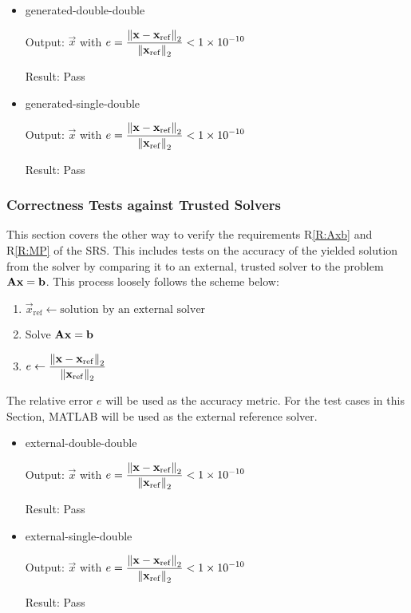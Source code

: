 \documentclass[12pt, titlepage]{article}
\newcommand{\rref}[1]{R\ref{#1}}
\newcommand{\tref}[1]{T\ref{#1}}
\begin{document}
\begin{itemize}

\item[\tref{T:gdd}:]{generated-double-double}

  Output: \(\vec{x}\) with \(e = \displaystyle \frac{\left\lVert\mathbf{x} -
      \mathbf{x}_\mathrm{ref}\right\rVert_2}{\left\lVert\mathbf{x}_\mathrm{ref}\right\rVert_2} < \num{1e-10}\)

  Result: Pass

\item[\tref{T:gsd}:]{generated-single-double}

  Output: \(\vec{x}\) with \(e = \displaystyle \frac{\left\lVert\mathbf{x} -
      \mathbf{x}_\mathrm{ref}\right\rVert_2}{\left\lVert\mathbf{x}_\mathrm{ref}\right\rVert_2} < \num{1e-10}\)

  Result: Pass

\end{itemize}

\subsubsection{Correctness Tests against Trusted Solvers}
\label{sec:corr-tests-against}

This section covers the other way to verify the requirements \rref{R:Axb} and
\rref{R:MP} of the SRS. This includes tests on the accuracy of the yielded
solution from the solver by comparing it to an external, trusted solver to the
problem \(\mathbf{A}\mathbf{x} = \mathbf{b}\). This process loosely follows the scheme
below:

\begin{enumerate}
\item \(\vec{x}_\mathrm{ref} \gets \text{solution by an external solver}\)
\item Solve \(\mathbf{A}\mathbf{x} = \mathbf{b}\)
\item \(e \gets \displaystyle \frac{\left\lVert\mathbf{x} - \mathbf{x}_\mathrm{ref}\right\rVert_2}{\left\lVert\mathbf{x}_\mathrm{ref}\right\rVert_2}\)
\end{enumerate}

The relative error \(e\) will be used as the accuracy metric. For the test cases
in this Section, MATLAB\textsuperscript{\textregistered} will be used as the
external reference solver.

\begin{itemize}

\item[\tref{T:exdd}:]{external-double-double}

  Output: \(\vec{x}\) with \(e = \displaystyle \frac{\left\lVert\mathbf{x} -
      \mathbf{x}_\mathrm{ref}\right\rVert_2}{\left\lVert\mathbf{x}_\mathrm{ref}\right\rVert_2} < \num{1e-10}\)

  Result: Pass

\item[\tref{T:exsd}:]{external-single-double}

  Output: \(\vec{x}\) with \(e = \displaystyle \frac{\left\lVert\mathbf{x} -
      \mathbf{x}_\mathrm{ref}\right\rVert_2}{\left\lVert\mathbf{x}_\mathrm{ref}\right\rVert_2} < \num{1e-10}\)

  Result: Pass

\end{itemize}
\end{document}
